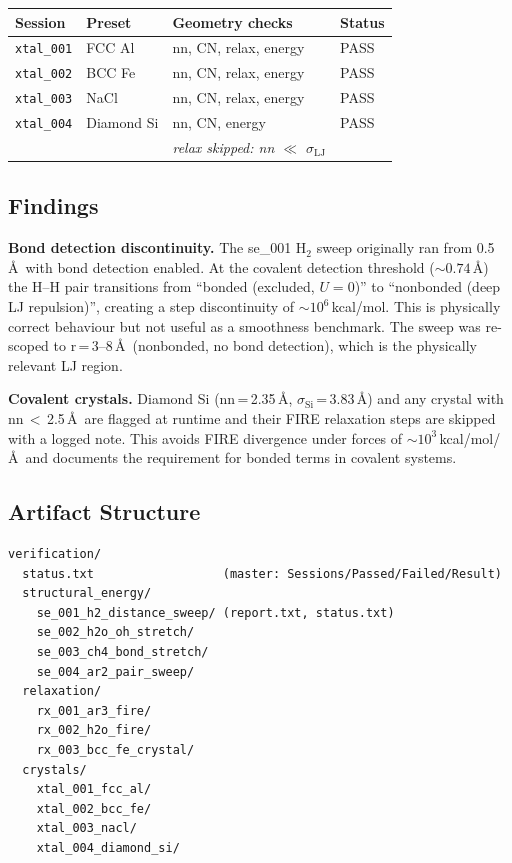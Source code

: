 \documentclass[11pt]{article}
\begin{document}
\begin{center}
\begin{tabular}{llll}
\toprule
Session & Preset & Geometry checks & Status \\
\midrule
\texttt{xtal\_001} & FCC Al  & nn, CN, relax, energy & PASS \\
\texttt{xtal\_002} & BCC Fe  & nn, CN, relax, energy & PASS \\
\texttt{xtal\_003} & NaCl    & nn, CN, relax, energy & PASS \\
\texttt{xtal\_004} & Diamond Si & nn, CN, energy      & PASS \\
                   &            & \textit{relax skipped: nn $\ll$ $\sigma_{\mathrm{LJ}}$} & \\
\bottomrule
\end{tabular}
\end{center}

\subsection{Findings}

\textbf{Bond detection discontinuity.}  The se\_001 H$_2$ sweep originally
ran from 0.5\,\AA\ with bond detection enabled.  At the covalent detection
threshold (${\sim}0.74$\,\AA) the H--H pair transitions from ``bonded
(excluded, $U=0$)'' to ``nonbonded (deep LJ repulsion)'', creating a step
discontinuity of ${\sim}10^6$\,kcal/mol.  This is physically correct
behaviour but not useful as a smoothness benchmark.  The sweep was
re-scoped to r\,=\,3--8\,\AA\ (nonbonded, no bond detection), which is the
physically relevant LJ region.

\textbf{Covalent crystals.}  Diamond Si (nn\,=\,2.35\,\AA,
$\sigma_{\mathrm{Si}}$\,=\,3.83\,\AA) and any crystal with
nn\,$<$\,2.5\,\AA\ are flagged at runtime and their FIRE relaxation steps
are skipped with a logged note.  This avoids FIRE divergence under forces
of ${\sim}10^3$\,kcal/mol/\AA\ and documents the requirement for bonded
terms in covalent systems.

\subsection{Artifact Structure}

\begin{verbatim}
verification/
  status.txt                  (master: Sessions/Passed/Failed/Result)
  structural_energy/
    se_001_h2_distance_sweep/ (report.txt, status.txt)
    se_002_h2o_oh_stretch/
    se_003_ch4_bond_stretch/
    se_004_ar2_pair_sweep/
  relaxation/
    rx_001_ar3_fire/
    rx_002_h2o_fire/
    rx_003_bcc_fe_crystal/
  crystals/
    xtal_001_fcc_al/
    xtal_002_bcc_fe/
    xtal_003_nacl/
    xtal_004_diamond_si/
\end{verbatim}
\end{document}
